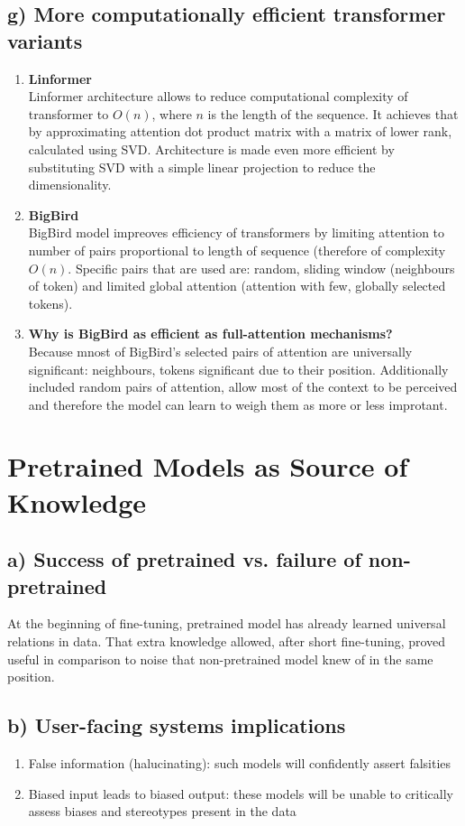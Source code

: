 \documentclass[12pt]{article}
\begin{document}
\subsection*{g) More computationally efficient transformer variants}
\begin{enumerate}
\item \textbf{Linformer} \\
  Linformer architecture allows to reduce computational complexity of transformer to \(O(n)\), where \(n\) is the length of the sequence. It achieves that by approximating attention dot product matrix with a matrix of lower rank, calculated using SVD. Architecture is made even more efficient by substituting SVD with a simple linear projection to reduce the dimensionality.
\item \textbf{BigBird} \\
  BigBird model impreoves efficiency of transformers by limiting attention to number of pairs proportional to length of sequence (therefore of complexity \(O(n)\). Specific pairs that are used are: random, sliding window (neighbours of token) and limited global attention (attention with few, globally selected tokens).
\item \textbf{Why is BigBird as efficient as full-attention mechanisms?} \\
  Because mnost of BigBird's selected pairs of attention are universally significant: neighbours, tokens significant due to their position. Additionally included random pairs of attention, allow most of the context to be perceived and therefore the model can learn to weigh them as more or less improtant.
\end{enumerate}

\section{Pretrained Models as Source of Knowledge}
\subsection*{a) Success of pretrained vs. failure of non-pretrained}
At the beginning of fine-tuning, pretrained model has already learned universal relations in data. That extra knowledge allowed, after short fine-tuning, proved useful in comparison to noise that non-pretrained model knew of in the same position.
\subsection*{b) User-facing systems implications}
\begin{enumerate}
\item False information (halucinating): such models will confidently assert falsities
  \item Biased input leads to biased output: these models will be unable to critically assess biases and stereotypes present in the data
\end{enumerate}
\end{document}
